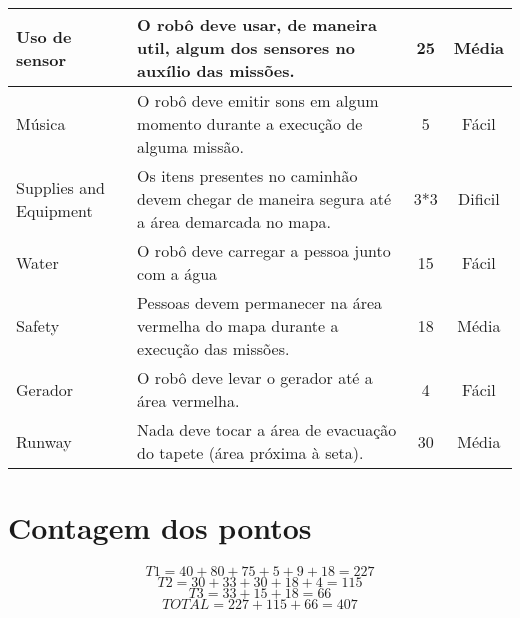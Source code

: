 \begin{table}[h]
\begin{tabular}{|p{3.5cm}|p{7.5cm}|c|c|}
Uso de sensor                                 & O robô deve usar, de maneira util, algum dos sensores no auxílio das missões.                                     & 25                                      & Média                                     \\ \hline
Música                                 & O robô deve emitir sons em algum momento durante a execução de alguma missão.                                     & 5                                      & Fácil                                     \\ \hline
Supplies and Equipment                         & Os itens presentes no caminhão devem chegar de maneira segura até a área demarcada no mapa.                                     & 3*3                                      & Dificil                                     \\ \hline
Water                                 & O robô deve carregar a pessoa junto com a água   & 15    & Fácil \\ \hline
Safety                         & Pessoas devem permanecer na área vermelha do mapa durante a execução das missões.                                     & 18                                      & Média                                     \\ \hline
Gerador                   & O robô deve levar o gerador até a área vermelha.        &   4   & Fácil   \\ \hline
Runway                         & Nada deve tocar a área de evacuação do tapete (área próxima à seta).                                     & 30                                      & Média                                     \\ \hline




\end{tabular}
\end{table}

\section{Contagem dos pontos}
\begin{equation}
  T1 = 40+80+75+5+9+18 = 227
\end{equation}
\begin{equation}
  T2 = 30+33+30+18+4 = 115
\end{equation}
\begin{equation}
  T3 = 33+15+18 = 66
\end{equation}
\begin{equation}
  TOTAL = 227+115+66 = 407
\end{equation}

